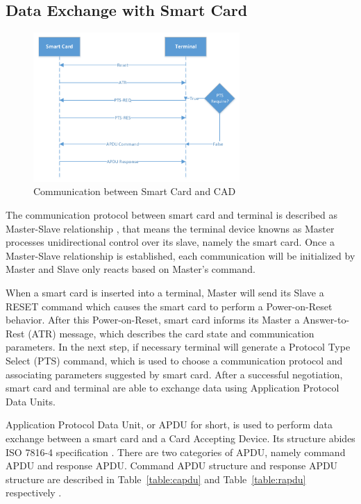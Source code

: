 \subsection{Data Exchange with Smart Card}

\begin{figure}[!htbp]
	\centering
	\includegraphics[width=0.7\textwidth]{master-slave-relationship}
		\caption{Communication between Smart Card and CAD \cite{handbuch}}
	\label{fig:master-slave-relationship}
\end{figure}
The communication protocol between smart card and terminal is described as Master-Slave relationship \cite{handbuch}, that means the terminal device knowns as Master processes unidirectional control over its slave, namely the smart card. Once a Master-Slave relationship is established, each communication will be initialized by Master and Slave only reacts based on Master's command. 

When a smart card is inserted into a terminal, Master will send its Slave a RESET command which causes the smart card to perform a Power-on-Reset behavior. After this Power-on-Reset, smart card informs its Master a Answer-to-Rest (ATR) message, which describes the card state and communication parameters. In the next step, if necessary terminal will generate a Protocol Type Select (PTS) command, which is used to choose a communication protocol and associating parameters suggested by smart card. After a successful negotiation, smart card and terminal are able to exchange data using Application Protocol Data Units.
  
Application Protocol Data Unit, or APDU for short, is used  to perform data exchange between a smart card and a Card Accepting Device.  Its structure abides ISO 7816-4 specification \cite{chen}. There are two categories of APDU, namely command APDU and response APDU. Command APDU structure and response APDU structure are described in Table~\ref{table:capdu} and Table~\ref{table:rapdu} respectively \cite{handbuch}. 

